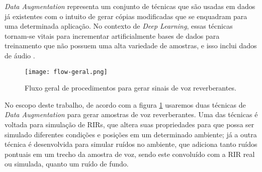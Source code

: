 \textit{Data Augmentation} representa um conjunto de técnicas que são usadas em dados já existentes com o intuito de gerar cópias
modificadas que se enquadram para uma determinada aplicação. No contexto de \textit{Deep Learning}, essas técnicas tornam-se vitais
para incrementar artificialmente bases de dados para treinamento que não possuem uma alta variedade de amostras, e isso inclui 
dados de áudio \cite{DL_Data_Aug_sc,Metric_Data_Aug_sc}.

\begin{figure} [H]
    \centering
    \texttt{[image: flow-geral.png]}
    \caption{Fluxo geral de procedimentos para gerar sinais de voz reverberantes.}
    \label{fig:flow-geral}
\end{figure} 

No escopo deste trabalho, de acordo com a figura \ref{fig:flow-geral} usaremos duas técnicas de \textit{Data Augmentation} para gerar amostras
de voz reverberantes. Uma das técnicas é voltada para simulação de RIRs, que altera suas propriedades para que possa ser simulado diferentes condições
e posições em um determinado ambiente; já a outra técnica é desenvolvida para simular ruídos no ambiente, que adiciona tanto ruídos pontuais em um trecho
da amostra de voz, sendo este convoluído com a RIR real ou simulada, quanto um ruído de fundo.

